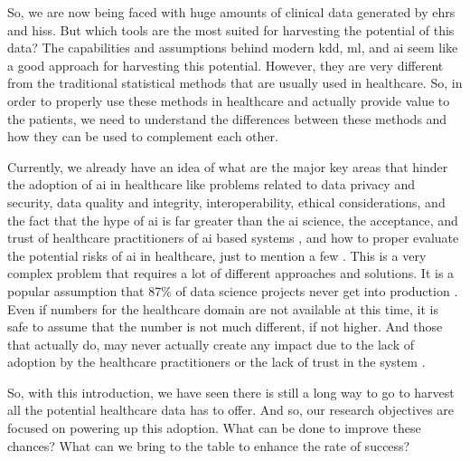 So, we are now being faced with huge amounts of clinical data generated by \acp{ehr} and \acp{his}. But which tools are the most suited for harvesting the potential of this data? 
The capabilities and assumptions behind modern \ac{kdd}, \ac{ml}, and \ac{ai} seem like a good approach for harvesting this potential. However, they are very different from the traditional statistical methods that are usually used in healthcare.
So, in order to properly use these methods in healthcare and actually provide value to the patients, we need to understand the differences between these methods and how they can be used to complement each other.

Currently, we already have an idea of what are the major key areas that hinder the adoption of \ac{ai} in healthcare like problems related to data privacy and security, data quality and integrity, interoperability, ethical considerations, and the fact that the hype of \ac{ai} is far greater than the \ac{ai} science, the acceptance, and trust of healthcare practitioners of \ac{ai} based systems \cite{muhiyaddinImpactClinicalDecision2020,kilsdonkFactorsInfluencingImplementation2017}, and how to proper evaluate the potential risks of \ac{ai} in healthcare, just to mention a few \cite{topolHighperformanceMedicineConvergence2019a}.
This is a very complex problem that requires a lot of different approaches and solutions. It is a popular assumption that 87\% of data science projects never get into production \cite{Why87Data2019}. Even if numbers for the healthcare domain are not available at this time, it is safe to assume that the number is not much different, if not higher. And those that actually do, may never actually create any impact due to the lack of adoption by the healthcare practitioners or the lack of trust in the system \cite{walkerModelGuidedDecisionMakingThromboprophylaxis2023}.

So, with this introduction, we have seen there is still a long way to go to harvest all the potential healthcare data has to offer. And so, our research objectives are focused on powering up this adoption. What can be done to improve these chances? What can we bring to the table to enhance the rate of success?






